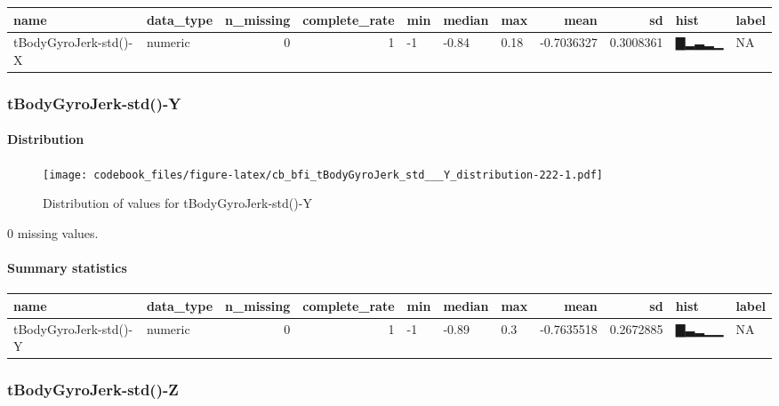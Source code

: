 \documentclass[
]{article}
\begin{document}
\begin{longtable}[]{@{}llrrlllrrll@{}}
\toprule
name & data\_type & n\_missing & complete\_rate & min & median & max &
mean & sd & hist & label \\
\midrule
\endhead
tBodyGyroJerk-std()-X & numeric & 0 & 1 & -1 & -0.84 & 0.18 & -0.7036327
& 0.3008361 & ▇▂▃▂▁ & NA \\
\bottomrule
\end{longtable}

\hypertarget{tBodyGyroJerk_std___Y}{%
\subsubsection{tBodyGyroJerk-std()-Y}\label{tBodyGyroJerk_std___Y}}

\hypertarget{tBodyGyroJerk_std___Y_distribution}{%
\paragraph{Distribution}\label{tBodyGyroJerk_std___Y_distribution}}

\begin{figure}
\centering
\texttt{[image: codebook\_files/figure-latex/cb\_bfi\_tBodyGyroJerk\_std\_\_\_Y\_distribution-222-1.pdf]}
\caption{Distribution of values for tBodyGyroJerk-std()-Y}
\end{figure}

0 missing values.

\hypertarget{tBodyGyroJerk_std___Y_summary}{%
\paragraph{Summary statistics}\label{tBodyGyroJerk_std___Y_summary}}

\begin{longtable}[]{@{}llrrlllrrll@{}}
\toprule
name & data\_type & n\_missing & complete\_rate & min & median & max &
mean & sd & hist & label \\
\midrule
\endhead
tBodyGyroJerk-std()-Y & numeric & 0 & 1 & -1 & -0.89 & 0.3 & -0.7635518
& 0.2672885 & ▇▃▂▁▁ & NA \\
\bottomrule
\end{longtable}

\hypertarget{tBodyGyroJerk_std___Z}{%
\subsubsection{tBodyGyroJerk-std()-Z}\label{tBodyGyroJerk_std___Z}}
\end{document}
